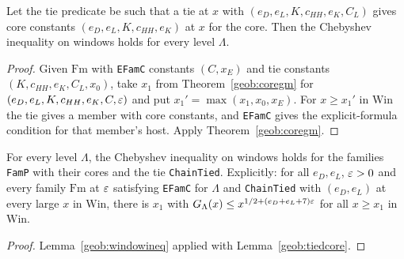 \begin{lemma}\label{geob:windowineq}
Let the tie predicate be such that a tie at $x$ with
$(e_D,e_L,K,c_{HH},e_K,C_L)$ gives core constants
$(e_D,e_L,K,c_{HH},e_K)$ at $x$ for the core. Then the Chebyshev inequality on
windows holds for every level $\Lambda$.
\end{lemma}
\begin{proof}
Given $\mathrm{Fm}$ with \texttt{EFamC} constants $(C,x_E)$ and tie constants
$(K,c_{HH},e_K,C_L,x_0)$, take $x_1$ from Theorem~\ref{geob:coregm} for
$(e_D,e_L,K,c_{HH},e_K,C,\varepsilon)$ and put $x_1'=\max(x_1,x_0,x_E)$. For
$x\ge x_1'$ in $\mathrm{Win}$ the tie gives a member with core constants, and
\texttt{EFamC} gives the explicit-formula condition for that member's host.
Apply Theorem~\ref{geob:coregm}.
\end{proof}

\begin{theorem}\label{geob:levelgm}
For every level $\Lambda$, the Chebyshev inequality on windows holds for the
families \texttt{FamP} with their cores and the tie \texttt{ChainTied}.
Explicitly: for all $e_D,e_L$, $\varepsilon>0$ and every family $\mathrm{Fm}$ at $\varepsilon$
satisfying \texttt{EFamC} for $\Lambda$ and \texttt{ChainTied} with $(e_D,e_L)$
at every large $x$ in $\mathrm{Win}$, there is $x_1$ with
$G_{\Lambda}(x)\le x^{1/2+(e_D+e_L+7)\varepsilon}$ for all $x\ge x_1$ in $\mathrm{Win}$.
\end{theorem}
\begin{proof}
Lemma~\ref{geob:windowineq} applied with Lemma~\ref{geob:tiedcore}.
\end{proof}

